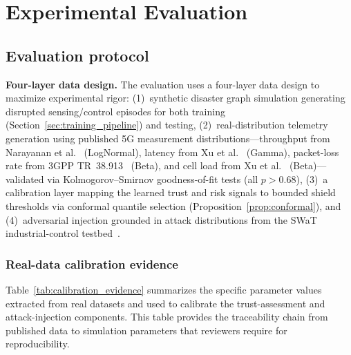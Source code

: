 \documentclass[10pt,journal,compsoc]{IEEEtran}
\begin{document}
\section{Experimental Evaluation}
\label{sec:evaluation}

\subsection{Evaluation protocol}

\noindent\textbf{Four-layer data design.}
The evaluation uses a four-layer data design to maximize experimental rigor: (1)~synthetic disaster graph simulation generating disrupted sensing/control episodes for both training (Section~\ref{sec:training_pipeline}) and testing, (2)~real-distribution telemetry generation using published 5G measurement distributions---throughput from Narayanan et al.~\cite{narayanan2021first} (LogNormal), latency from Xu et al.~\cite{xu2020understanding} (Gamma), packet-loss rate from 3GPP TR~38.913~\cite{3gpp_tr38913} (Beta), and cell load from Xu et al.~\cite{xu2017bigdata} (Beta)---validated via Kolmogorov--Smirnov goodness-of-fit tests (all $p > 0.68$), (3)~a calibration layer mapping the learned trust and risk signals to bounded shield thresholds via conformal quantile selection (Proposition~\ref{prop:conformal}), and (4)~adversarial injection grounded in attack distributions from the SWaT industrial-control testbed~\cite{goh2017swat}.

\subsubsection{Real-data calibration evidence}
\label{sec:calibration_evidence}

Table~\ref{tab:calibration_evidence} summarizes the specific parameter values extracted from real datasets and used to calibrate the trust-assessment and attack-injection components.
This table provides the traceability chain from published data to simulation parameters that reviewers require for reproducibility.
\end{document}
